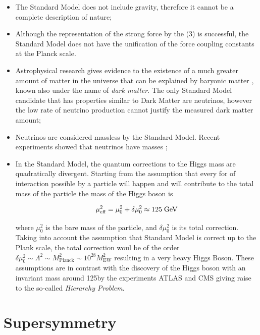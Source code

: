 \begin{itemize}
	\item The Standard Model does not include gravity, therefore it cannot be a complete description of nature;
	\item Although the representation of the strong force by the (3) is successful, the Standard Model does not have the unification of the force coupling constants at the Planck scale.
	\item Astrophysical research gives evidence to the existence of a much greater amount of matter in the universe that can be explained by baryonic matter \cite{deBoer:2005tm}, known also under the name of \textit{dark matter}. The only Standard Model candidate that has properties similar to Dark Matter are neutrinos, however the low rate of neutrino production cannot justify the measured dark matter amount;
	\item Neutrinos are considered massless by the Standard Model. Recent experiments showed that neutrinos have masses \cite{Fukuda:1998mi};
	\item In the Standard Model, the quantum corrections to the Higgs mass are quadratically divergent. Starting from the assumption that every for of interaction possible by a particle will happen and will contribute to the total mass of the particle the mass of the Higgs boson is 
	
	\begin{equation}
	\mu^{2}_{\text{eff}} = \mu^{2}_{0} + \delta\mu^{2}_{0} \approx 125\;\text{Ge}\kern-0.06667em\text{V}
	\end{equation}
	
	where $\mu^{2}_{0}$ is the bare mass of the particle, and $\delta\mu^{2}_{0} $ is its total correction. Taking into account the assumption that Standard Model is correct up to the Plank scale, the total correction woul be of the order  $\delta\mu^{2}_{0}  \sim \Lambda^{2} \sim M^{2}_{\text{Planck}} \sim 10^{28}M^{2}_{\text{EW}}$ resulting in a very heavy Higgs Boson. These assumptions are in contrast with the discovery of the Higgs boson with an invariant mass around 125\gev by the experiments ATLAS \cite{Aad:2012tfa} and CMS \cite{Chatrchyan:2012xdj} giving raise to the so-called \textit{Hierarchy Problem}.
	
\end{itemize}

\clearpage

\section{Supersymmetry}

